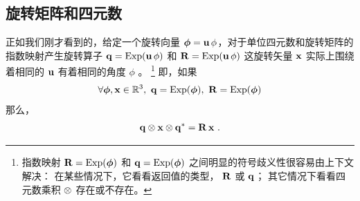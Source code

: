 



\subsection{旋转矩阵和四元数}

正如我们刚才看到的，给定一个旋转向量 ${\bm \phi}={\bf u}\,\phi$，对于单位四元数和旋转矩阵的指数映射产生旋转算子 
${\bf q}=\operatorname*{Exp}({\bf u}\,\phi)$ 
和
${\bf R}=\operatorname*{Exp}({\bf u}\,\phi)$ 
这旋转矢量 ${\bf x}$ 实际上围绕着相同的 ${\bf u}$ 有着相同的角度 $\phi$ 。%
%
\footnote{指数映射 ${\bf R}=\operatorname*{Exp}({\bm \phi})$ 和 ${\bf q} = \operatorname*{Exp}({\bm \phi})$ 之间明显的符号歧义性很容易由上下文解决：
在某些情况下，它看看返回值的类型， ${\bf R}$ 或 ${\bf q}$； 
其它情况下看看四元数乘积 $\otimes$ 存在或不存在。}
即，如果
%
\begin{align}
\forall {\bm \phi},{\bf x} \in {\mathbb R}^3,~ 
{\bf q} = \operatorname*{Exp}({\bm \phi}) 
,~ 
{\bf R}=\operatorname*{Exp}({\bm \phi})
\end{align}
%
%
%
%
那么，
%
\begin{align}
{\bf q}\otimes{\bf x}\otimes{\bf q}^* = {\bf R}\,{\bf x}~.
\end{align}
